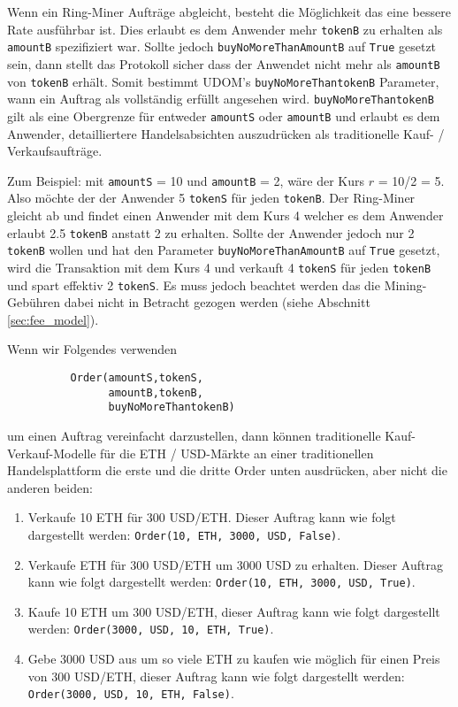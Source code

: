 \documentclass[UTF8,nofonts]{article}
\begin{document}
\begin{multicols}{2}
Wenn ein Ring-Miner Aufträge abgleicht, besteht die Möglichkeit das eine bessere Rate ausführbar ist. Dies erlaubt es dem Anwender mehr \verb|tokenB| zu erhalten als \verb|amountB| spezifiziert war. Sollte jedoch \verb|buyNoMoreThanAmountB| auf \verb|True| gesetzt sein, dann stellt das Protokoll sicher dass der Anwendet nicht mehr als \verb|amountB| von \verb|tokenB| erhält. Somit bestimmt UDOM's \verb|buyNoMoreThantokenB| Parameter, wann ein Auftrag als vollständig erfüllt angesehen wird. \verb|buyNoMoreThantokenB| gilt als eine Obergrenze für entweder \verb|amountS| oder \verb|amountB| und erlaubt es dem Anwender, detailliertere Handelsabsichten auszudrücken als traditionelle Kauf- / Verkaufsaufträge.

Zum Beispiel: mit \verb|amountS| = 10 und \verb|amountB| = 2, wäre der Kurs $r$ = 10/2 = 5. Also möchte der der Anwender 5 \verb|tokenS| für jeden \verb|tokenB|. Der Ring-Miner gleicht ab und findet einen Anwender mit dem Kurs 4 welcher es dem Anwender erlaubt 2.5 \verb|tokenB| anstatt 2 zu erhalten. Sollte der Anwender jedoch nur 2 \verb|tokenB| wollen und hat den Parameter \verb|buyNoMoreThanAmountB| auf \verb|True| gesetzt, wird die Transaktion mit dem Kurs 4 und verkauft 4 \verb|tokenS| für jeden \verb|tokenB| und spart effektiv 2 \verb|tokenS|. Es muss jedoch beachtet werden das die Mining-Gebühren dabei nicht in Betracht gezogen werden (siehe Abschnitt \ref{sec:fee_model}).

Wenn wir Folgendes verwenden


\begin{verbatim}
	      Order(amountS,tokenS,
	            amountB,tokenB,
	            buyNoMoreThantokenB)
\end{verbatim}

um einen Auftrag vereinfacht darzustellen, dann können traditionelle Kauf-Verkauf-Modelle für die ETH / USD-Märkte an einer traditionellen Handelsplattform die erste und die dritte Order unten ausdrücken, aber nicht die anderen beiden:

\begin{enumerate}
	\item Verkaufe 10 ETH für 300 USD/ETH. Dieser Auftrag kann wie folgt dargestellt werden: \verb|Order(10, ETH, 3000, USD, False)|.
	\item Verkaufe ETH für 300 USD/ETH um 3000 USD zu erhalten. Dieser Auftrag kann wie folgt dargestellt werden: \verb|Order(10, ETH, 3000, USD, True)|.
	\item Kaufe 10 ETH um 300 USD/ETH, dieser Auftrag kann wie folgt dargestellt werden: \verb|Order(3000, USD, 10, ETH, True)|.
	\item Gebe 3000 USD aus um so viele ETH zu kaufen wie möglich für einen Preis von 300 USD/ETH, dieser Auftrag kann wie folgt dargestellt werden: \verb|Order(3000, USD, 10, ETH, False)|.
\end{enumerate}




\end{multicols}
\end{document}
